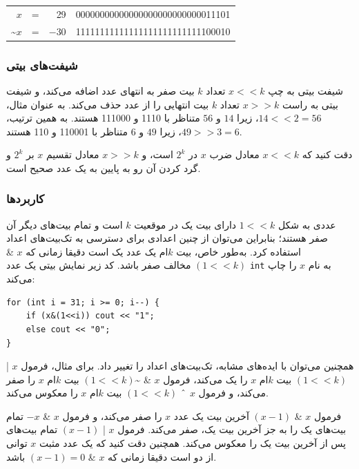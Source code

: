 \begin{center}
\begin{tabular}{rrrr}
$x$ & = & 29 &   00000000000000000000000000011101 \\
\textasciitilde$x$ & = & $-30$ & 11111111111111111111111111100010 \\
\end{tabular}
\end{center}

\subsubsection{شیفت‌های بیتی}


شیفت بیتی به چپ $x < < k$ تعداد $k$ بیت صفر
به انتهای عدد اضافه می‌کند،
و شیفت بیتی به راست $x > > k$
تعداد $k$ بیت انتهایی را از عدد حذف می‌کند.
به عنوان مثال، $14 < < 2 = 56$،
زیرا $14$ و $56$ متناظر با 1110 و 111000 هستند.
به همین ترتیب، $49 > > 3 = 6$،
زیرا $49$ و $6$ متناظر با 110001 و 110 هستند.

دقت کنید که $x < < k$
معادل ضرب $x$ در $2^k$ است،
و $x > > k$
معادل تقسیم $x$ بر $2^k$ و
گرد کردن آن رو به پایین به یک عدد صحیح است.

\subsubsection{کاربردها}

عددی به شکل $1 < < k$ دارای بیت یک در موقعیت $k$ است و تمام بیت‌های دیگر آن صفر هستند؛ بنابراین می‌توان از چنین اعدادی برای دسترسی به تک‌بیت‌های اعداد استفاده کرد.
به‌طور خاص، بیت $k$ام یک عدد یک است دقیقا زمانی که $x$ \& $(1 < < k)$ مخالف صفر باشد.
کد زیر نمایش بیتی یک عدد \texttt{int} به نام $x$ را چاپ می‌کند:

\begin{lstlisting}
for (int i = 31; i >= 0; i--) {
    if (x&(1<<i)) cout << "1";
    else cout << "0";
}
\end{lstlisting}

همچنین می‌توان با ایده‌های مشابه، تک‌بیت‌های اعداد را تغییر داد.
برای مثال، فرمول $x$ | $(1 < < k)$ بیت $k$ام $x$ را یک می‌کند،
فرمول $x$ \& \textasciitilde $(1 < < k)$ بیت $k$ام $x$ را صفر می‌کند،
و فرمول $x$ $\XOR$ $(1 < < k)$ بیت $k$ام $x$ را معکوس می‌کند.

فرمول $x$ \& $(x-1)$ آخرین بیت یک عدد $x$ را صفر می‌کند،
و فرمول $x$ \& $-x$ تمام بیت‌های یک را به جز آخرین بیت یک، صفر می‌کند.
فرمول $x$ | $(x-1)$ تمام بیت‌های پس از آخرین بیت یک را معکوس می‌کند.
همچنین دقت کنید که یک عدد مثبت $x$ توانی از دو است دقیقا زمانی که $x$ \& $(x-1) = 0$ باشد.


